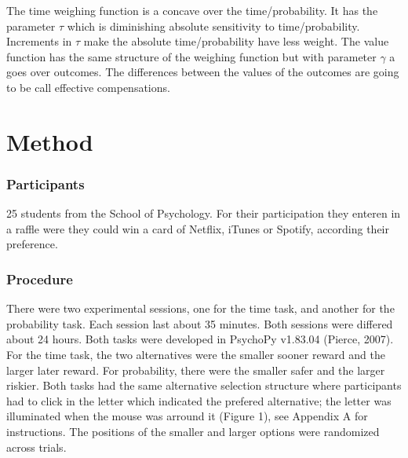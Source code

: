 \documentclass[jou,apacite]{apa6}
\begin{document}
The time weighing function is a concave over the time/probability. It has the parameter $\tau$ which is diminishing absolute sensitivity to time/probability. Increments in $\tau$ make the absolute time/probability have less weight. The value function has the same structure of the weighing function but with parameter $\gamma$ a goes over outcomes. The differences between the values of the outcomes are going to be call effective compensations.




\section{Method}
\subsubsection{Participants}
25 students from the School of Psychology. For their participation they enteren in a raffle were they could win a card of Netflix, iTunes or Spotify, according their preference. 

\subsubsection{Procedure}
There were two experimental sessions, one for the time task, and another for the probability task. Each session last about 35 minutes. Both sessions were differed about 24 hours. Both tasks were developed in PsychoPy v1.83.04 (Pierce, 2007). For the time task, the two alternatives were the smaller sooner reward and the larger later reward. For probability, there were the smaller safer and the larger riskier. Both tasks had the same alternative selection structure where participants had to click in the letter which indicated the prefered alternative; the letter was illuminated when the mouse was arround it (Figure 1), see Appendix A for instructions. The positions of the smaller and larger options were randomized across trials. 
\end{document}
